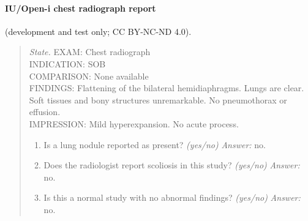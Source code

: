 \paragraph{IU/Open-i chest radiograph report} (development and test only; CC BY-NC-ND 4.0).
\begin{quote}\footnotesize\raggedright
\textit{State.} EXAM: Chest radiograph\\ INDICATION: SOB\\ COMPARISON: None available\\ FINDINGS: Flattening of the bilateral hemidiaphragms. Lungs are clear. Soft tissues and bony structures unremarkable. No pneumothorax or effusion.\\ IMPRESSION: Mild hyperexpansion. No acute process.
\begin{enumerate}[label=Q\arabic*.,leftmargin=2.2em,itemsep=1pt,topsep=2pt]
  \item Is a lung nodule reported as present? \textit{(yes/no)} \textit{Answer:} no.
  \item Does the radiologist report scoliosis in this study? \textit{(yes/no)} \textit{Answer:} no.
  \item Is this a normal study with no abnormal findings? \textit{(yes/no)} \textit{Answer:} no.
\end{enumerate}
\end{quote}

